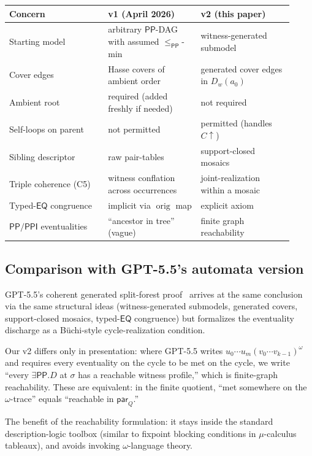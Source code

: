 \documentclass[11pt]{article}
\theoremstyle{definition}
\theoremstyle{remark}
\newcommand{\PP}{\mathsf{PP}}
\newcommand{\PPI}{\mathsf{PPI}}
\newcommand{\EQ}{\mathsf{EQ}}
\newcommand{\orig}{\operatorname{orig}}
\begin{document}
\begin{center}
\renewcommand{\arraystretch}{1.25}
\begin{tabular}{p{0.32\linewidth}p{0.30\linewidth}p{0.30\linewidth}}
\toprule
Concern & v1 (April 2026) & v2 (this paper) \\
\midrule
Starting model & arbitrary $\PP$-DAG with assumed $\le_{\PP}$-min &
witness-generated submodel \\
Cover edges & Hasse covers of ambient order & generated cover
edges in $D_w(a_0)$ \\
Ambient root & required (added freshly if needed) & not required \\
Self-loops on parent & not permitted & permitted (handles
$C\!\uparrow$) \\
Sibling descriptor & raw pair-tables & support-closed mosaics \\
Triple coherence (C5) & witness conflation across occurrences &
joint-realization within a mosaic \\
Typed-$\EQ$ congruence & implicit via $\orig$ map & explicit axiom
\\
$\PP/\PPI$ eventualities & ``ancestor in tree'' (vague) & finite
graph reachability \\
\bottomrule
\end{tabular}
\end{center}

\subsection{Comparison with GPT-5.5's automata version}

GPT-5.5's coherent generated split-forest
proof~\cite{GPT55Generated} arrives at the same conclusion via the
same structural ideas (witness-generated submodels, generated
covers, support-closed mosaics, typed-$\EQ$ congruence) but
formalizes the eventuality discharge as a B\"uchi-style
cycle-realization condition.

Our v2 differs only in presentation: where GPT-5.5 writes
$u_0\cdots u_m(v_0\cdots v_{k-1})^\omega$ and requires every
eventuality on the cycle to be met on the cycle, we write
``every $\exists\PP.D$ at $\sigma$ has a reachable witness
profile,'' which is finite-graph reachability.  These are
equivalent: in the finite quotient, ``met somewhere on the
$\omega$-trace'' equals ``reachable in $\mathsf{par}_Q$.''

The benefit of the reachability formulation: it stays inside the
standard description-logic toolbox (similar to fixpoint blocking
conditions in $\mu$-calculus tableaux), and avoids invoking
$\omega$-language theory.
\end{document}
